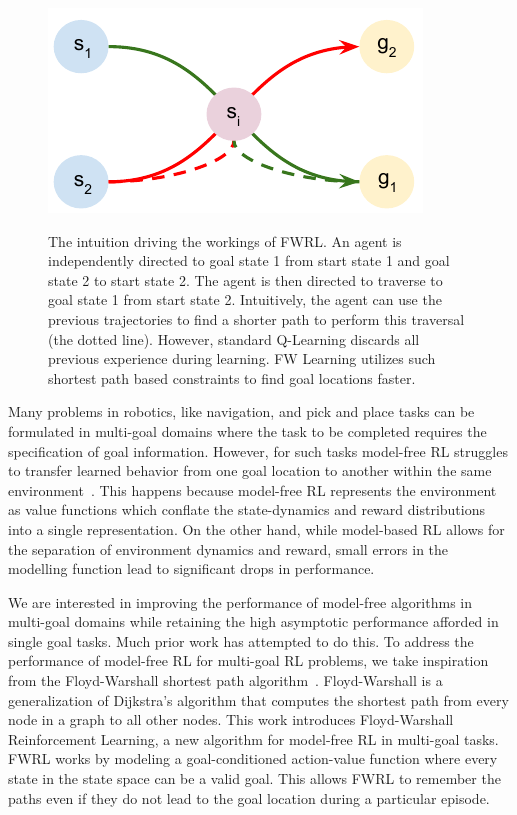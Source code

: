 \begin{figure}%
\includegraphics[width=\columnwidth]{./media/optimal_trajectories.pdf}\\
\caption{The intuition driving the workings of FWRL. An agent is
independently directed to goal state 1 from start state 1 and goal state
2 to start state 2. The agent is then directed to traverse to goal state
1 from start state 2. Intuitively, the agent can use the previous
trajectories to find a shorter path to perform this traversal (the
dotted line). However, standard Q-Learning discards all previous
experience during learning. FW Learning utilizes such shortest path
based constraints to find goal locations faster.  }
\label{fig:ql-fw-grid-world-results}%
\end{figure}

Many problems in robotics, like navigation, and  pick and place tasks can be
formulated in multi-goal domains where the task to be completed requires the
specification of goal information. However, for such tasks model-free RL struggles
to transfer learned behavior from one goal location to another within the same
environment~\citep{dhiman2018critical}. This happens because model-free RL represents the environment as
value functions which conflate the state-dynamics and reward distributions into
a single representation.
On the other hand, while model-based RL allows for the separation of environment
dynamics and reward, small errors in the modelling function lead to significant
drops in performance.

We are interested in improving the performance of model-free algorithms
in multi-goal domains while retaining the high asymptotic performance
afforded in single goal tasks. Much prior work has attempted to do this. 
To address the performance of model-free RL for multi-goal RL problems, we take
inspiration from the Floyd-Warshall shortest path algorithm~\cite{floydwarshall1962}.
Floyd-Warshall is a generalization of Dijkstra's algorithm that computes the
shortest path from every node in a graph to all other nodes.
This work introduces Floyd-Warshall Reinforcement Learning, a new algorithm for
model-free RL in multi-goal tasks. FWRL works by
modeling a goal-conditioned action-value function where every state in the state
space can be a valid goal. This allows FWRL to remember the paths even if they
do not lead to the goal location during a particular episode. 

